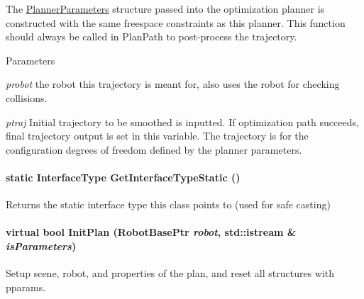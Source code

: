 The \hyperlink{classOpenRAVE_1_1PlannerBase_1_1PlannerParameters}{PlannerParameters} structure passed into the optimization planner is constructed with the same freespace constraints as this planner. This function should always be called in PlanPath to post-\/process the trajectory. 
\begin{DoxyParams}{Parameters}
\item[{\em probot}]the robot this trajectory is meant for, also uses the robot for checking collisions. \item[{\em ptraj}]Initial trajectory to be smoothed is inputted. If optimization path succeeds, final trajectory output is set in this variable. The trajectory is for the configuration degrees of freedom defined by the planner parameters. \end{DoxyParams}
\hypertarget{classOpenRAVE_1_1PlannerBase_affeafe65e7c4094f282d273dedbf069b}{
\paragraph[{GetInterfaceTypeStatic}]{\setlength{\rightskip}{0pt plus 5cm}static InterfaceType GetInterfaceTypeStatic ()}\hfill}
\label{classOpenRAVE_1_1PlannerBase_affeafe65e7c4094f282d273dedbf069b}
\begin{DoxyReturn}{Returns}
the static interface type this class points to (used for safe casting) 
\end{DoxyReturn}
\hypertarget{classOpenRAVE_1_1PlannerBase_ac1d85f92b0e42d911c1cab6db2c90b61}{
\paragraph[{InitPlan}]{\setlength{\rightskip}{0pt plus 5cm}virtual bool InitPlan (RobotBasePtr {\em robot}, \/  std::istream \& {\em isParameters})}\hfill}
\label{classOpenRAVE_1_1PlannerBase_ac1d85f92b0e42d911c1cab6db2c90b61}


Setup scene, robot, and properties of the plan, and reset all structures with pparams. 


